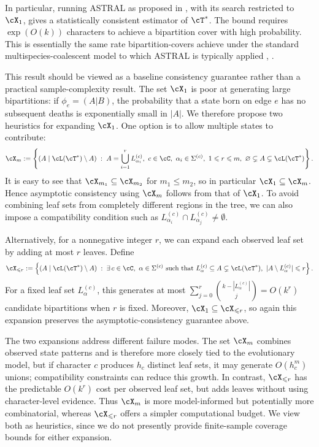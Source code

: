 In particular, running ASTRAL as proposed in \cite{evans2026_canby_identifiability},
with its search restricted to $\cX_1$, gives a statistically consistent estimator of
$\cT^*$. The bound requires $\exp(O(k))$ characters to achieve a bipartition cover
with high probability. This is essentially the same rate
bipartition-covers achieve under the standard multispecies-coalescent model to which
ASTRAL is typically applied \cite{uricchio2016_bipartition_cover}, \cite{mcnulty2026_improved_bipartition_cover_bound}.

This result should be viewed as a baseline consistency guarantee rather
than a practical sample-complexity result. The set $\cX_1$ is poor at generating
large bipartitions: if $\phi_e=(A|B)$, the probability that a state born on edge $e$
has no subsequent deaths is exponentially small in $|A|$. We therefore propose two
heuristics for expanding $\cX_1$. One option is to allow multiple states to contribute:
%
\[\cX_m := \left\{(A \mid \cL(\cT^*) \setminus A) \; : \;
A = \bigcup_{i=1}^r L_{\alpha_i}^{(c)},\ c \in \cC,\ \alpha_i \in \Sigma^{(c)},\
1 \leq r \leq m,\ \varnothing \subsetneq A \subsetneq \cL(\cT^*)\right\}.\]
%
\noindent It is easy to see that $\cX_{m_1} \subseteq \cX_{m_2}$ for $m_1 \leq m_2$, so in
 particular $\cX_1 \subseteq \cX_m$. Hence asymptotic consistency using $\cX_m$ follows
 from that of $\cX_1$. To avoid combining leaf sets from
 completely different regions in the tree, we can also impose a compatibility condition such as
 $L_{\alpha_i}^{(c)} \cap L_{\alpha_j}^{(c)} \neq \emptyset$.

Alternatively, for a nonnegative integer $r$, we can expand each observed leaf set by adding at most $r$ leaves. Define
%
\[\cX_{\leq r} := \left\{(A \mid \cL(\cT^*) \setminus A) \; : \;
\exists\, c \in \cC,\ \alpha \in \Sigma^{(c)}\text{ such that }
L_\alpha^{(c)} \subseteq A \subsetneq \cL(\cT^*),\ |A \setminus L_\alpha^{(c)}| \leq r\right\}.\]
%
\noindent For a fixed leaf set $L_\alpha^{(c)}$, this generates at most
$\sum_{j=0}^r \binom{k-|L_\alpha^{(c)}|}{j} = O(k^r)$ candidate bipartitions when $r$ is fixed.
Moreover, $\cX_1 \subseteq \cX_{\leq r}$, so again this expansion preserves the asymptotic-consistency guarantee above.

The two expansions address different failure modes. The set $\cX_m$ combines observed
state patterns and is therefore more closely tied to the evolutionary model, but if character
$c$ produces $h_c$ distinct leaf sets, it may generate $O(h_c^m)$ unions; compatibility
constraints can reduce this growth. In contrast, $\cX_{\leq r}$ has the predictable
$O(k^r)$ cost per observed leaf set, but adds leaves without using character-level evidence.
Thus $\cX_m$ is more model-informed but potentially more combinatorial, whereas
$\cX_{\leq r}$ offers a simpler computational budget. We view both as heuristics, since
we do not presently provide finite-sample coverage bounds for either expansion.


